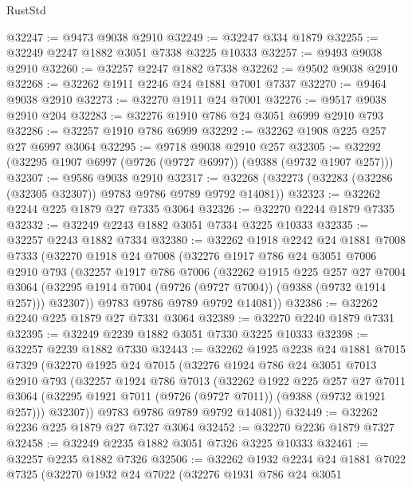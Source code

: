 \begin{lexlean}{RustStd}
\begin{coremodule}
@32247 := @9473 @9038 @2910
@32249 := @32247 @334 @1879
@32255 := @32249 @2247 @1882 @3051 @7338 @3225 @10333
@32257 := @9493 @9038 @2910
@32260 := @32257 @2247 @1882 @7338
@32262 := @9502 @9038 @2910
@32268 := @32262 @1911 @2246 @24 @1881 @7001 @7337
@32270 := @9464 @9038 @2910
@32273 := @32270 @1911 @24 @7001
@32276 := @9517 @9038 @2910 @204
@32283 := @32276 @1910 @786 @24 @3051 @6999 @2910 @793
@32286 := @32257 @1910 @786 @6999
@32292 := @32262 @1908 @225 @257 @27 @6997 @3064
@32295 := @9718 @9038 @2910 @257
@32305 := @32292 (@32295 @1907 @6997 (@9726 (@9727 @6997)) (@9388 (@9732 @1907 @257)))
@32307 := @9586 @9038 @2910
@32317 := @32268 (@32273 (@32283 (@32286 (@32305 @32307)) @9783 @9786 @9789 @9792 @14081))
@32323 := @32262 @2244 @225 @1879 @27 @7335 @3064
@32326 := @32270 @2244 @1879 @7335
@32332 := @32249 @2243 @1882 @3051 @7334 @3225 @10333
@32335 := @32257 @2243 @1882 @7334
@32380 := @32262
    @1918
    @2242
    @24
    @1881
    @7008
    @7333
    (@32270
      @1918
      @24
      @7008
      (@32276
        @1917
        @786
        @24
        @3051
        @7006
        @2910
        @793
        (@32257
          @1917
          @786
          @7006
          (@32262
            @1915
            @225
            @257
            @27
            @7004
            @3064
            (@32295 @1914 @7004 (@9726 (@9727 @7004)) (@9388 (@9732 @1914 @257)))
            @32307))
        @9783
        @9786
        @9789
        @9792
        @14081))
@32386 := @32262 @2240 @225 @1879 @27 @7331 @3064
@32389 := @32270 @2240 @1879 @7331
@32395 := @32249 @2239 @1882 @3051 @7330 @3225 @10333
@32398 := @32257 @2239 @1882 @7330
@32443 := @32262
    @1925
    @2238
    @24
    @1881
    @7015
    @7329
    (@32270
      @1925
      @24
      @7015
      (@32276
        @1924
        @786
        @24
        @3051
        @7013
        @2910
        @793
        (@32257
          @1924
          @786
          @7013
          (@32262
            @1922
            @225
            @257
            @27
            @7011
            @3064
            (@32295 @1921 @7011 (@9726 (@9727 @7011)) (@9388 (@9732 @1921 @257)))
            @32307))
        @9783
        @9786
        @9789
        @9792
        @14081))
@32449 := @32262 @2236 @225 @1879 @27 @7327 @3064
@32452 := @32270 @2236 @1879 @7327
@32458 := @32249 @2235 @1882 @3051 @7326 @3225 @10333
@32461 := @32257 @2235 @1882 @7326
@32506 := @32262
    @1932
    @2234
    @24
    @1881
    @7022
    @7325
    (@32270
      @1932
      @24
      @7022
      (@32276
        @1931
        @786
        @24
        @3051

\end{coremodule}
\end{lexlean}
